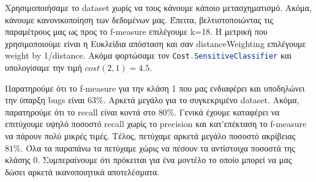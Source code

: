 Χρησιμοποιήσαμε το dataset χωρίς να τους κάνουμε κάποιο μετασχηματισμό.
Ακόμα, κάνουμε κανονικοποίηση των δεδομένων μας.
Έπειτα, βελτιστοποιώντας τις παραμέτρους μας ως προς το f-measure επιλέγουμε k=18.
Η μετρική που χρησιμοποιούμε είναι η Ευκλείδια απόσταση και σαν distanceWeighting επιλέγουμε weight by 1/distance.
Ακόμα φορτώσαμε τον
\lstinline[language=Java]!Cost.SensitiveClassifier!
και υπολογίσαμε την τιμή $cost(2,1)=4.5$.

Παρατηρούμε ότι το f-measure για την κλάση 1 που μας ενδιαφέρει και υποδηλώνει την ύπαρξη bugs είναι $63\%$.
Αρκετά μεγάλο για το συγκεκριμένο dataset.
Ακόμα, παρατηρούμε ότι το recall είναι κοντά στο $80\%$.
Γενικά έχουμε καταφέρει να επιτύχουμε υψηλό ποσοστό recall χωρίς το precision και κατ'επέκταση το f-measure να πάρουν πολύ μικρές τιμές.
Τέλος, πετύχαμε αρκετά μεγάλο ποσοστό ακρίβειας $81\%$.
Όλα τα παραπάνω τα πετύχαμε χώρις να πέσουν τα αντίστοιχα ποσοστά της κλάσης 0.
Συμπεραίνουμε ότι πρόκειται για ένα μοντέλο το οποίο μπορεί να μας δώσει αρκετά ικανοποιητικά αποτελέσματα.